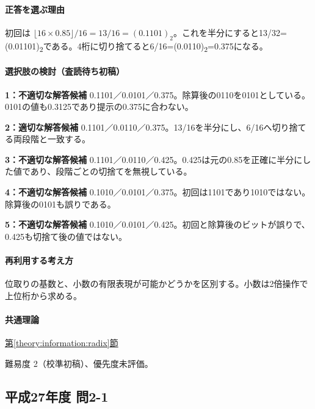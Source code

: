 \paragraph{正答を選ぶ理由} 初回は \(\lfloor16\times0.85\rfloor/16=13/16=(0.1101)_2\)。これを半分にすると13/32=\allowbreak{}(0.01101)\textsubscript{2}である。4桁に切り捨てると6/16=\allowbreak{}(0.0110)\textsubscript{2}=0.375になる。

\paragraph{選択肢の検討（査読待ち初稿）}\mbox{}\par

\noindent\textbf{1：不適切な解答候補} 0.1101／0.0101／0.375。除算後の0110を0101としている。0101の値も0.3125であり提示の0.375に合わない。\par

\noindent\textbf{2：適切な解答候補} 0.1101／0.0110／0.375。13/16を半分にし、6/16へ切り捨てる両段階と一致する。\par

\noindent\textbf{3：不適切な解答候補} 0.1101／0.0110／0.425。0.425は元の0.85を正確に半分にした値であり、段階ごとの切捨てを無視している。\par

\noindent\textbf{4：不適切な解答候補} 0.1010／0.0101／0.375。初回は1101であり1010ではない。除算後の0101も誤りである。\par

\noindent\textbf{5：不適切な解答候補} 0.1010／0.0101／0.425。初回と除算後のビットが誤りで、0.425も切捨て後の値ではない。\par

\paragraph{再利用する考え方} 位取りの基数と、小数の有限表現が可能かどうかを区別する。小数は2倍操作で上位桁から求める。

\paragraph{共通理論} \hyperref[theory:information:radix]{第\ref*{theory:information:radix}節}

\par 難易度 2（校準初稿）、優先度未評価。

\subsection{平成27年度 問2-1}
\label{q:h27-reg-basic-2-1}

